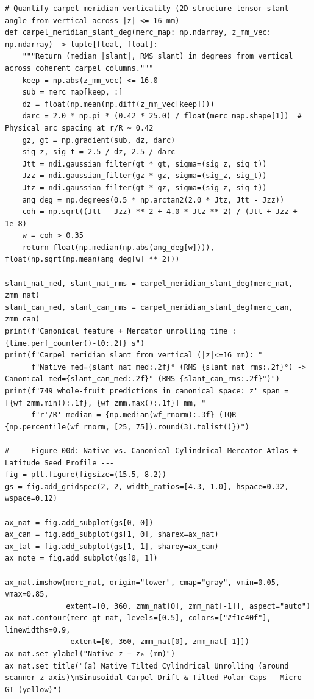 \documentclass[10pt,a4paper]{article}
\renewcommand{\_}{\origunderscore\allowbreak}
\begin{document}
\begin{codebox}
\begin{lstlisting}[style=pybmed]
# Quantify carpel meridian verticality (2D structure-tensor slant angle from vertical across |z| <= 16 mm)
def carpel_meridian_slant_deg(merc_map: np.ndarray, z_mm_vec: np.ndarray) -> tuple[float, float]:
    """Return (median |slant|, RMS slant) in degrees from vertical across coherent carpel columns."""
    keep = np.abs(z_mm_vec) <= 16.0
    sub = merc_map[keep, :]
    dz = float(np.mean(np.diff(z_mm_vec[keep])))
    darc = 2.0 * np.pi * (0.42 * 25.0) / float(merc_map.shape[1])  # Physical arc spacing at r/R ~ 0.42
    gz, gt = np.gradient(sub, dz, darc)
    sig_z, sig_t = 2.5 / dz, 2.5 / darc
    Jtt = ndi.gaussian_filter(gt * gt, sigma=(sig_z, sig_t))
    Jzz = ndi.gaussian_filter(gz * gz, sigma=(sig_z, sig_t))
    Jtz = ndi.gaussian_filter(gt * gz, sigma=(sig_z, sig_t))
    ang_deg = np.degrees(0.5 * np.arctan2(2.0 * Jtz, Jtt - Jzz))
    coh = np.sqrt((Jtt - Jzz) ** 2 + 4.0 * Jtz ** 2) / (Jtt + Jzz + 1e-8)
    w = coh > 0.35
    return float(np.median(np.abs(ang_deg[w]))), float(np.sqrt(np.mean(ang_deg[w] ** 2)))

slant_nat_med, slant_nat_rms = carpel_meridian_slant_deg(merc_nat, zmm_nat)
slant_can_med, slant_can_rms = carpel_meridian_slant_deg(merc_can, zmm_can)
print(f"Canonical feature + Mercator unrolling time : {time.perf_counter()-t0:.2f} s")
print(f"Carpel meridian slant from vertical (|z|<=16 mm): "
      f"Native med={slant_nat_med:.2f}° (RMS {slant_nat_rms:.2f}°) -> Canonical med={slant_can_med:.2f}° (RMS {slant_can_rms:.2f}°)")
print(f"749 whole-fruit predictions in canonical space: z' span = [{wf_zmm.min():.1f}, {wf_zmm.max():.1f}] mm, "
      f"r'/R' median = {np.median(wf_rnorm):.3f} (IQR {np.percentile(wf_rnorm, [25, 75]).round(3).tolist()})")

# --- Figure 00d: Native vs. Canonical Cylindrical Mercator Atlas + Latitude Seed Profile ---
fig = plt.figure(figsize=(15.5, 8.2))
gs = fig.add_gridspec(2, 2, width_ratios=[4.3, 1.0], hspace=0.32, wspace=0.12)

ax_nat = fig.add_subplot(gs[0, 0])
ax_can = fig.add_subplot(gs[1, 0], sharex=ax_nat)
ax_lat = fig.add_subplot(gs[1, 1], sharey=ax_can)
ax_note = fig.add_subplot(gs[0, 1])

ax_nat.imshow(merc_nat, origin="lower", cmap="gray", vmin=0.05, vmax=0.85,
              extent=[0, 360, zmm_nat[0], zmm_nat[-1]], aspect="auto")
ax_nat.contour(merc_gt_nat, levels=[0.5], colors=["#f1c40f"], linewidths=0.9,
               extent=[0, 360, zmm_nat[0], zmm_nat[-1]])
ax_nat.set_ylabel("Native z − z₀ (mm)")
ax_nat.set_title("(a) Native Tilted Cylindrical Unrolling (around scanner z-axis)\nSinusoidal Carpel Drift & Tilted Polar Caps — Micro-GT (yellow)")


\end{lstlisting}
\end{codebox}
\end{document}
